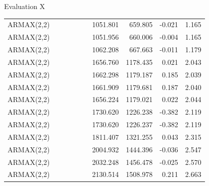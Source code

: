 \documentclass[t,xcolor={table},fleqn]{beamer}
\newcommand{\cmark}{\color{darkgreen}\ding{51}}%
\newcommand{\xmark}{\color{darkred}\ding{55}}%
\begin{document}
\begin{frame}{Evaluation X}
\begin{table}[!ht]
\begin{tabularx}{\linewidth}{Xlllllrrrr}
ARMAX(2,2) & \cmark & \cmark & \xmark & \cmark & \cmark & 1051.801 & 659.805 & -0.021 & 1.165\\
ARMAX(2,2) & \cmark & \cmark & \cmark & \cmark & \cmark & 1051.956 & 660.006 & \cellcolor{green!35}-0.004 & 1.165\\
ARMAX(2,2) & \cmark & \cmark & \xmark & \xmark & \cmark & 1062.208 & 667.663 & -0.011 & 1.179\\
ARMAX(2,2) & \cmark & \xmark & \cmark & \xmark & \xmark & 1656.760 & 1178.435 & 0.021 & 2.043\\
ARMAX(2,2) & \xmark & \cmark & \xmark & \xmark & \xmark & 1662.298 & 1179.187 & 0.185 & 2.039\\
ARMAX(2,2) & \xmark & \cmark & \xmark & \cmark & \xmark & 1661.909 & 1179.681 & 0.187 & 2.040\\
ARMAX(2,2) & \xmark & \cmark & \cmark & \cmark & \xmark & 1656.224 & 1179.021 & 0.022 & 2.044\\
ARMAX(2,2) & \xmark & \xmark & \cmark & \xmark & \xmark & 1730.620 & 1226.238 & -0.382 & 2.119\\
ARMAX(2,2) & \xmark & \xmark & \cmark & \cmark & \xmark & 1730.620 & 1226.237 & -0.382 & 2.119\\
ARMAX(2,2) & \xmark & \cmark & \cmark & \cmark & \cmark & 1811.407 & 1321.255 & 0.043 & 2.315\\
ARMAX(2,2) & \xmark & \xmark & \cmark & \xmark & \cmark & 2004.932 & 1444.396 & -0.036 & 2.547\\
ARMAX(2,2) & \xmark & \cmark & \cmark & \xmark & \cmark & 2032.248 & 1456.478 & -0.025 & 2.570\\
ARMAX(2,2) & \xmark & \xmark & \xmark & \xmark & \cmark & 2130.514 & 1508.978 & 0.211 & 2.663\\
\end{tabularx}
\end{table}

\end{frame}
\end{document}
